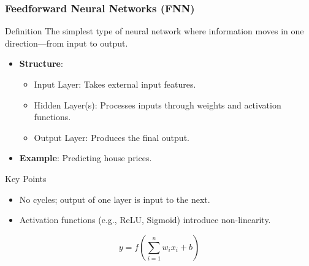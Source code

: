 \documentclass[aspectratio=169]{beamer}
\begin{document}
\begin{frame}[fragile]
    \frametitle{Feedforward Neural Networks (FNN)}
    \begin{block}{Definition}
        The simplest type of neural network where information moves in one direction—from input to output.
    \end{block}
    \begin{itemize}
        \item \textbf{Structure}:
            \begin{itemize}
                \item Input Layer: Takes external input features.
                \item Hidden Layer(s): Processes inputs through weights and activation functions.
                \item Output Layer: Produces the final output.
            \end{itemize}
        \item \textbf{Example}: Predicting house prices.
    \end{itemize}
    \begin{block}{Key Points}
        \begin{itemize}
            \item No cycles; output of one layer is input to the next.
            \item Activation functions (e.g., ReLU, Sigmoid) introduce non-linearity.
        \end{itemize}
    \end{block}
    \begin{equation}
        y = f\left( \sum_{i=1}^{n} w_i x_i + b \right)
    \end{equation}
\end{frame}
\end{document}
